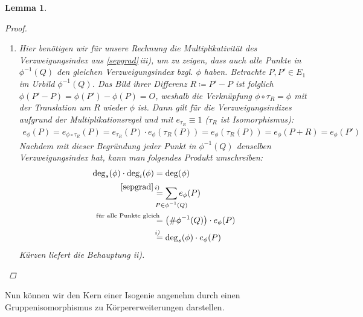 \documentclass[english, german, parskip=half]{scrartcl}
\newtheorem{Lemma}[Satz]{Lemma}
\theoremstyle{definition}
\theoremstyle{remark}
\newcommand*{\degs}{\operatorname{\deg}_s} %
\newcommand*{\degi}{\operatorname{\deg}_i} %
\renewcommand{\O}{O}
\begin{document}
\begin{Lemma}
\begin{proof}
\begin{enumerate}[label=\roman*)]
  \item Hier benötigen wir für unsere Rechnung die Multiplikativität
    des Verzweigungsindex aus \autoref{sepgrad}\,iii), um zu zeigen,
    dass auch alle Punkte in $\phi^{-1}(Q)$ den gleichen
    Verzweigungsindex bzgl. $\phi$ haben.
    Betrachte $P,P'\in E_1$ im Urbild $\phi^{-1}(Q)$. Das Bild ihrer
    Differenz $R\coloneqq P'-P$ ist folglich
    $\phi(P'-P)=\phi(P')-\phi(P)=\O$, weshalb die Verknüpfung
    $\phi\circ\tau_R = \phi$ mit der Translation um $R$ wieder $\phi$
    ist.
    Dann gilt für die Verzweigungsindizes aufgrund der
    Multiplikationsregel und mit $e_{\tau_R}\equiv1$ ($\tau_R$ ist
    Isomorphismus):
    \begin{gather*}
      e_\phi(P)
      = e_{\phi\circ\tau_R}(P)
      = e_{\tau_R}(P) \cdot e_\phi(\tau_R(P))
      = e_\phi(\tau_R(P))
      = e_\phi(P+R)
      = e_\phi(P')
    \end{gather*}
    Nachdem mit dieser Begründung jeder Punkt in $\phi^{-1}(Q)$
    denselben Verzweigungsindex hat, kann man folgendes Produkt
    umschreiben:
    \begin{align*}
      \degs(\phi) \cdot \degi(\phi)
      &= \deg(\phi)\\
      &\overset{\mathllap{\ref{sepgrad}\,i)}}{=}
        \sum_{\mathclap{P\in\phi^{-1}(Q)}} e_\phi(P)\\
      &\overset{\mathllap{\text{für alle Punkte gleich}}}{=}
        \left( \#\phi^{-1}(Q) \right) \cdot e_\phi(P)\\
      &\overset{\mathllap{\text{\emph{i)}}}}{=}
        \degs(\phi)\cdot e_\phi(P)
    \end{align*}
    Kürzen liefert die Behauptung \emph{ii)}.
  \end{enumerate}  
\end{proof}
\end{Lemma}

Nun können wir den Kern einer Isogenie angenehm durch einen
Gruppenisomorphismus zu Körpererweiterungen darstellen.
\end{document}
